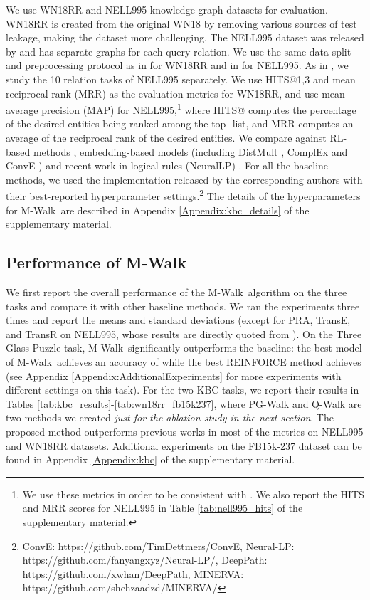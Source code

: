 \documentclass{article}
\newcommand{\modelname}{M-Walk}
\begin{document}
	We use WN18RR and NELL995 knowledge graph datasets for evaluation. WN18RR \cite{dettmers2018conve} is created from the original WN18 \cite{bordes2013translating} by removing various sources of test leakage, making the dataset more challenging. The NELL995 dataset was released by \cite{DeepPath} and has separate graphs for each query relation.
	We use the same data split and preprocessing protocol as in \cite{dettmers2018conve} for WN18RR and in \cite{DeepPath, GoforaWalk} for NELL995. 
	As in \cite{DeepPath, GoforaWalk}, we study the 10 relation tasks of NELL995 separately.
	We use HITS@1,3 and mean reciprocal rank (MRR) as the evaluation metrics for WN18RR, and use mean average precision (MAP) for NELL995,\footnote{We use these metrics in order to be consistent with \cite{DeepPath,GoforaWalk}. We also report the HITS and MRR scores for NELL995 in Table \ref{tab:nell995_hits} of the supplementary material.} where HITS@ computes the percentage of the desired entities being ranked among the top- list, and MRR computes an average of the reciprocal rank of the desired entities. 
	We compare against RL-based methods \cite{DeepPath, GoforaWalk}, embedding-based models (including DistMult \cite{DBLP:journals/corr/YangYHGD14a}, ComplEx \cite{trouillon2016complex} and ConvE \cite{dettmers2018conve}) and recent work in logical rules (NeuralLP) \cite{yang2017differentiable}. 
	For all the baseline methods, we used the implementation released by the corresponding authors with their best-reported hyperparameter settings.\footnote{ConvE: https://github.com/TimDettmers/ConvE, Neural-LP: https://github.com/fanyangxyz/Neural-LP/, DeepPath: https://github.com/xwhan/DeepPath, MINERVA: https://github.com/shehzaadzd/MINERVA/} The details of the hyperparameters for \modelname~are described in Appendix \ref{Appendix:kbc_details} of the supplementary material.
	
	
\subsection{Performance of \modelname}


	We first report the overall performance of the \modelname~algorithm on the three tasks and compare it with other baseline methods. We ran the experiments three times and report the means and standard deviations (except for PRA, TransE, and TransR on NELL995, whose results are directly quoted from \cite{DeepPath}). On the Three Glass Puzzle task, \modelname~significantly outperforms the baseline: the best model of \modelname~achieves an accuracy of  while the best REINFORCE method achieves  (see Appendix \ref{Appendix:AdditionalExperiments} for more experiments with different settings on this task). For the two KBC tasks, we report their results in Tables \ref{tab:kbc_results}-\ref{tab:wn18rr_fb15k237}, where PG-Walk and Q-Walk are two methods we created \emph{just for the ablation study in the next section}. The proposed method outperforms previous works in most of the metrics on NELL995 and WN18RR datasets. Additional experiments on the FB15k-237 dataset can be found in Appendix \ref{Appendix:kbc} of the supplementary material.
    	
\end{document}
